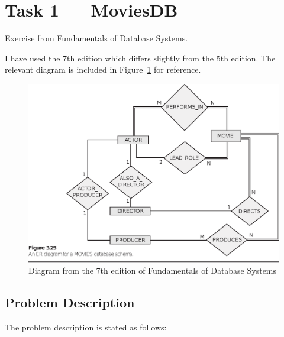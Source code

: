 %
%
%


\section{Task 1 --- MoviesDB}
Exercise from Fundamentals of Database Systems\cite{2dv513:fds}.

I have used the 7th edition which differs slightly from the 5th edition.
The relevant diagram is included in Figure~\ref{fig:fds_3-25} for reference.


\begin{figure}[htbp]
  \centering
  \includegraphics[width=\linewidth]{include/fds_figure_3-25.eps}
	\caption{Diagram from the 7th edition of Fundamentals of Database
           Systems\cite{2dv513:fds}}
  \label{fig:fds_3-25}
\end{figure}


\subsection{Problem Description}
The problem description \cite{2dv513:assignment1-instructions} is stated as
follows:

